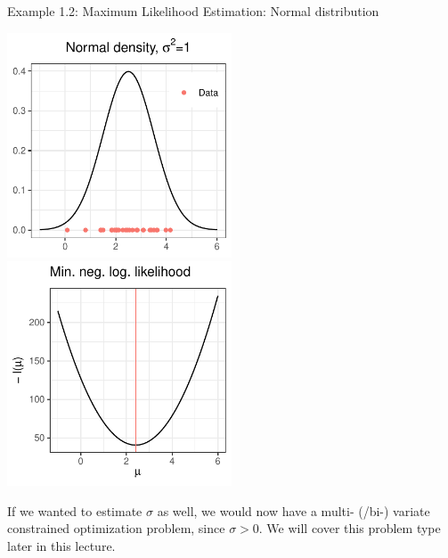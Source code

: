 \begin{vbframe}{Example 1.2: Maximum Likelihood Estimation: Normal distribution}
\framebreak
\begin{center}
	\begin{footnotesize}
	\includegraphics[width=0.5\textwidth, keepaspectratio]{figure_man/ml_normal_example_dnorm.pdf} \includegraphics[width=0.5\textwidth, keepaspectratio]{figure_man/ml_normal_example_negloglike.pdf} 
	\end{footnotesize}
\end{center}


\vspace{0.2cm}
\begin{footnotesize}
If we wanted to estimate $\sigma$ as well, we would now have a multi- (/bi-) variate constrained optimization problem, since $\sigma > 0$. We will cover this problem type later in this lecture.
\end{footnotesize}

\end{vbframe}



